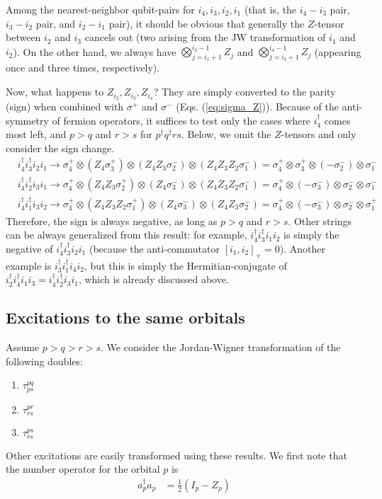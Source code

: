 \documentclass[prb,amsmath,amsfonts,amssymb]{revtex4}
\begin{document}
Among the nearest-neighbor qubit-pairs for $i_4, i_3, i_2, i_1$ (that is, the $i_4-i_3$ pair, $i_3-i_2$ pair, and $i_2-i_1$ pair), it should be obvious that generally the $Z$-tensor between $i_2$ and $i_3$ cancels out (two arising from the JW transformation of $i_1$ and $i_2$). On the other hand, we always have $\bigotimes_{j = i_1+1}^{i_2-1} Z_j$ and $\bigotimes_{j = i_3+1}^{i_4-1} Z_j$ (appearing once and three times, respectively). 

Now, what happens to $Z_{i_2}, Z_{i_3}, Z_{i_4}$? They are simply converted to the parity (sign) when combined with $\sigma^+$ and $\sigma^-$ (Eqs. (\ref{eq:sigma_Z})). Because of the anti-symmetry of fermion operators, it suffices to test only the cases where $i_4^\dag$ comes most left, and $p>q$ and $r>s$ for $p^\dag q^\dag r s$. Below, we omit the $Z$-tensors and only consider the sign change. 
\begin{align*}
%
&	i_{4}^\dag i_3^\dag i_2 i_1 \rightarrow 
\sigma_{4}^+ \otimes ( Z_4\sigma_{3}^+) \otimes (Z_4 Z_3 \sigma_{2}^- ) \otimes (Z_4 Z_3 Z_2\sigma_{1}^-) = \sigma_4^+ \otimes \sigma_3^+ \otimes (-\sigma^-_2) \otimes \sigma^-_1\\
&	i_{4}^\dag i_2^\dag i_3 i_1 \rightarrow 
\sigma_{4}^+  \otimes (Z_4 Z_3 \sigma_{2}^+ ) \otimes ( Z_4\sigma_{3}^-) \otimes (Z_4 Z_3 Z_2\sigma_{1}^-) = \sigma_4^+ \otimes (-\sigma_3^-) \otimes \sigma^-_2 \otimes \sigma^-_1\\
&	i_{4}^\dag i_1^\dag i_3 i_2 \rightarrow 
\sigma_{4}^+   \otimes (Z_4 Z_3 Z_2\sigma_{1}^+)  \otimes ( Z_4\sigma_{3}^-) \otimes (Z_4 Z_3 \sigma_{2}^- )= \sigma_4^+ \otimes (-\sigma_3^-) \otimes \sigma^-_2 \otimes \sigma^+_1
\end{align*}
Therefore, the sign is always negative, as long as $p>q$ and $r>s$.  Other strings can be always generalized from this result: for example, $i_4^\dag i_3^\dag i_1 i_2$ is simply the negative of $i^\dag_4 i^\dag_3 i_2 i_1$ (because the anti-commutator $\left[i_1,i_2\right]_+=0$). Another example is $i_3^\dag i_1^\dag i_4 i_2$, but this is simply the Hermitian-conjugate of $i^\dag_2 i^\dag_4 i_1 i_3 = i^\dag_4 i^\dag_2 i_3 i_1$, which is already discussed above.


\subsection{Excitations to the same orbitals}
Assume $p > q > r > s$. We consider the Jordan-Wigner transformation of the following doubles:
\begin{enumerate}
	\item $\tau^{pq}_{ps}$ 
	\item $\tau^{pr}_{rs}$
	\item $\tau^{ps}_{rs}$
\end{enumerate}
Other excitations are easily transformed using these results. We first note that the number operator for the orbital $p$ is
\begin{align}
	a_p^\dag a_p &= \frac{1}{2} (I_p - Z_p)
\end{align}
\end{document}
